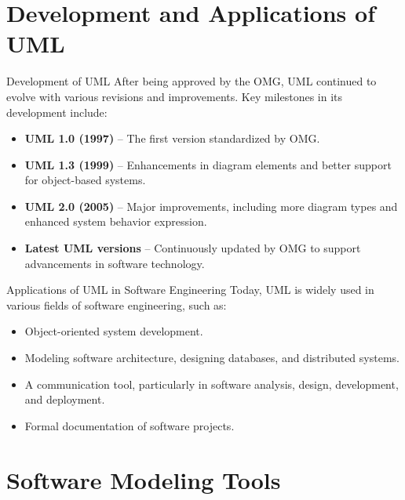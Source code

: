 \documentclass[aspectratio=169, table]{beamer}
\begin{document}
\section{Development and Applications of UML}

\begin{frame}{Development of UML}
	\vspace{20pt}
	After being approved by the OMG, UML continued to evolve with various revisions and improvements. Key milestones in its development include:
	\begin{itemize}
		\item \textbf{UML 1.0 (1997)} – The first version standardized by OMG.
		\item \textbf{UML 1.3 (1999)} – Enhancements in diagram elements and better support for object-based systems.
		\item \textbf{UML 2.0 (2005)} – Major improvements, including more diagram types and enhanced system behavior expression.
		\item \textbf{Latest UML versions} – Continuously updated by OMG to support advancements in software technology.
	\end{itemize}
\end{frame}

\begin{frame}{Applications of UML in Software Engineering}
	\vspace{20pt}
	Today, UML is widely used in various fields of software engineering, such as:
	\begin{itemize}
		\item Object-oriented system development.
		\item Modeling software architecture, designing databases, and distributed systems.
		\item A communication tool, particularly in software analysis, design, development, and deployment.
		\item Formal documentation of software projects.
	\end{itemize}
\end{frame}

\section{Software Modeling Tools}
\end{document}
